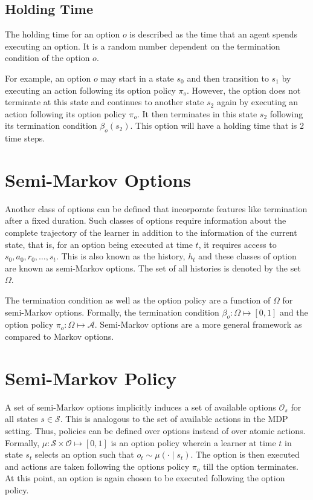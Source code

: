 \subsection{Holding Time}\label{sec:holding_time}

The holding time for an option $o$ is described as the time that an agent spends executing an option. It is a random number dependent on the termination condition of the option $o$.

For example, an option $o$ may start in a state $s_0$ and then transition to $s_1$ by executing an action following its option policy $\pi_o$. 
However, the option does not terminate at this state and continues to another state $s_2$ again by executing an action following its option policy $\pi_o$.
It then terminates in this state $s_2$ following its termination condition $\beta_o(s_2)$.
This option will have a holding time that is 2 time steps.

\section{Semi-Markov Options}

Another class of options can be defined that incorporate features like termination after a fixed duration.
Such classes of options require information about the complete trajectory of the learner in addition to the information of the current state, that is, for an option being executed at time $t$, it requires access to $s_0, a_0, r_0, \dots, s_t$.
This is also known as the history, $h_t$ and these classes of option are known as semi-Markov options.
The set of all histories is denoted by the set $\Omega$.

The termination condition as well as the option policy are a function of $\Omega$ for semi-Markov options.
Formally, the termination condition $\beta_o : \Omega \mapsto [0, 1]$ and the option policy $\pi_o : \Omega \mapsto \mathcal{A}$.
Semi-Markov options are a more general framework as compared to Markov options.

\section{Semi-Markov Policy}

A set of semi-Markov options implicitly induces a set of available options $\mathcal{O}_s$ for all states $s \in \mathcal{S}$.
This is analogous to the set of available actions in the MDP setting.
Thus, policies can be defined over options instead of over atomic actions. 
Formally, $\mu : \mathcal{S} \times \mathcal{O} \mapsto [0,1]$ is an option policy wherein a learner at time $t$ in state $s_t$ selects an option such that $o_t \sim \mu(\cdot \mid s_t)$.
The option is then executed and actions are taken following the options policy $\pi_o$ till the option terminates.
At this point, an option is again chosen to be executed following the option policy.


